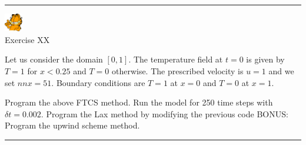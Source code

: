 \begin{center}
\begin{minipage}[t]{0.77\textwidth}
\par\noindent\rule{\textwidth}{0.4pt}

\begin{center}
\includegraphics[width=0.8cm]{images/garftr} \\
{\color{orange}Exercise XX}
\end{center}

Let us consider the domain $[0,1]$. The temperature field at $t=0$ is 
given by $T=1$ for $x<0.25$ and $T=0$ otherwise. The prescribed 
velocity is $u=1$ and we set $nnx=51$.
Boundary conditions are $T=1$ at $x=0$ and $T=0$ at $x=1$.

\begin{center}

\end{center}

Program the above FTCS method. Run the model for 250 time steps with $\delta t=0.002$. 
Program the Lax method by modifying the previous code
BONUS: Program the upwind scheme method. 

\par\noindent\rule{\textwidth}{0.4pt}
\end{minipage}
\end{center}



